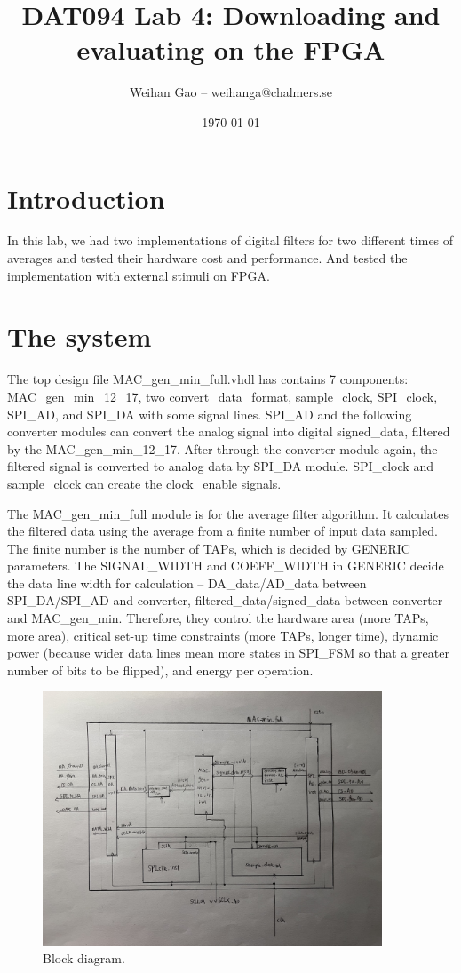 \documentclass[a4paper]{article}
\title{DAT094 Lab 4:  Downloading and evaluating on the FPGA}
\author{Weihan Gao – weihanga@chalmers.se}
\date{\today}
\begin{document}
\sloppy
\maketitle


\section{Introduction}
\label{sec:introduction}
In this lab, we had two implementations of digital filters for two different times of averages and tested their hardware cost and performance. And tested the implementation with external stimuli on FPGA.

\section{The system}
The top design file MAC\_gen\_min\_full.vhdl has contains 7 components: MAC\_gen\_min\_12\_17, two convert\_data\_format, sample\_clock, SPI\_clock, SPI\_AD, and SPI\_DA with some signal lines. SPI\_AD and the following converter modules can convert the analog signal into digital signed\_data, filtered by the MAC\_gen\_min\_12\_17. After through the converter module again, the filtered signal is converted to analog data by SPI\_DA module. SPI\_clock and sample\_clock can create the clock\_enable signals.


The MAC\_gen\_min\_full module is for the average filter algorithm. It calculates the filtered data using the average from a finite number of input data sampled. The finite number is the number of TAPs, which is decided by GENERIC parameters. The SIGNAL\_WIDTH and COEFF\_WIDTH in GENERIC decide the data line width for calculation – DA\_data/AD\_data between SPI\_DA/SPI\_AD and converter, filtered\_data/signed\_data between converter and MAC\_gen\_min. Therefore, they control the hardware area (more TAPs, more area), critical set-up time constraints (more TAPs, longer time), dynamic power (because wider data lines mean more states in SPI\_FSM so that a greater number of bits to be flipped), and energy per operation.


\newpage
\newpage

\begin{figure}[h]
\centering
\includegraphics[width=0.9\textwidth]{1.JPG}
\caption{\label{fig:data}Block diagram.}
\end{figure}
\end{document}
